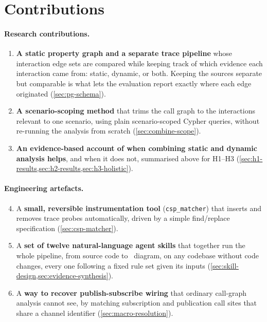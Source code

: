 \section{Contributions}

\paragraph{Research contributions.}
\begin{enumerate}
  \item \textbf{A static property graph and a separate trace pipeline}
    whose interaction edge sets are compared while keeping track of
    which evidence each interaction came from: static, dynamic, or
    both. Keeping the sources separate but comparable is what lets the
    evaluation report exactly where each edge originated
    (\cref{sec:pg-schema}).

  \item \textbf{A scenario-scoping method} that trims the call graph to
    the interactions relevant to one scenario, using plain
    scenario-scoped Cypher queries, without re-running the analysis from
    scratch (\cref{sec:combine-scope}).

  \item \textbf{An evidence-based account of when combining static and
    dynamic analysis helps}, and when it does not, summarised above for
    H1--H3 (\cref{sec:h1-results,sec:h2-results,sec:h3-holistic}).
\end{enumerate}

\paragraph{Engineering artefacts.}
\begin{enumerate}\setcounter{enumi}{3}
  \item A \textbf{small, reversible instrumentation tool}
    (\texttt{csp\_matcher}) that inserts and removes trace probes
    automatically, driven by a simple find/replace specification
    (\cref{sec:csp-matcher}).

  \item A \textbf{set of twelve natural-language agent skills} that
    together run the whole pipeline, from source code to \sysml\ diagram,
    on any codebase without code changes, every one following a fixed
    rule set given its inputs
    (\cref{sec:skill-design,sec:evidence-synthesis}).

  \item A \textbf{way to recover publish-subscribe wiring} that ordinary
    call-graph analysis cannot see, by matching subscription and
    publication call sites that share a channel identifier
    (\cref{sec:macro-resolution}).
\end{enumerate}

